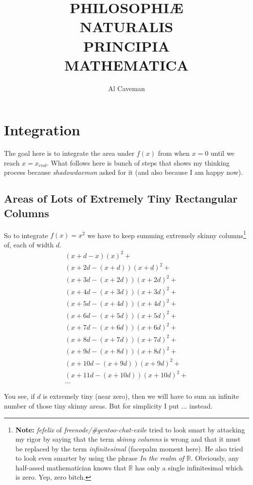 \documentclass{report}
\title{\Huge\sc \textbf{PHILOSOPHI\AE}\\ NATURALIS\\ \textbf{PRINCIPIA}\\ MATHEMATICA}
\author{Al Caveman}
\begin{document}
\maketitle
\tableofcontents

\chapter{Integration}
The goal here is to integrate the area under $f(x)$ from when $x = 0$ until we
reach $x = x_{end}$. What follows here is bunch of steps that shows my thinking
process because \emph{shadowdaemon} asked for it (and also because I am happy now).

\section{Areas of Lots of Extremely Tiny Rectangular Columns}
So to integrate $f(x) = x^2$ we have to keep summing extremely skinny
columns\footnote{\textbf{Note:} \emph{fefelix} of \emph{freenode/\#gentoo-chat-exile} tried to
look smart by attacking my rigor by saying that the term
\emph{skinny columns} is wrong and that it must be replaced by the term
\emph{infinitesimal} (facepalm moment here). He also tried to look
even smarter by using the phrase \emph{In the realm of $\mathbb{R}$}.
Obviously, any half-assed mathematician knows that $\mathbb{R}$ has only a single
infinitesimal which is zero. Yep, zero bitch.} of, each of
width $d$.
\[\begin{split}
  (x+d-x)(x)^2 + \\
  (x+2d-(x+d))(x+d)^2 + \\
  (x+3d-(x+2d))(x+2d)^2 + \\
  (x+4d-(x+3d))(x+3d)^2 + \\
  (x+5d-(x+4d))(x+4d)^2 + \\
  (x+6d-(x+5d))(x+5d)^2 + \\
  (x+7d-(x+6d))(x+6d)^2 + \\
  (x+8d-(x+7d))(x+7d)^2 + \\
  (x+9d-(x+8d))(x+8d)^2 + \\
  (x+10d-(x+9d))(x+9d)^2 + \\
  (x+11d-(x+10d))(x+10d)^2 + \\
  \ldots
\end{split}\]



You see, if $d$ is extremely tiny (near zero), then we will have to sum an
infinite number of those tiny skinny areas. But for simplicity I put $\ldots$
instead.
\end{document}
